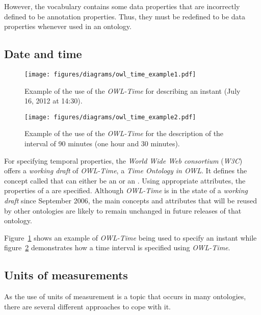 However, the vocabulary contains some data properties that are incorrectly defined to be annotation properties. Thus, they must be redefined to be data properties whenever used in an  ontology.

\subsection{Date and time}
\label{subsec:date_ontologies}

\begin{figure}
\centering
\texttt{[image: figures/diagrams/owl\_time\_example1.pdf]}
\caption{Example of the use of the \emph{OWL-Time} for describing an instant (July 16, 2012 at 14:30).}
\label{fig:owl_time_example1}
\end{figure}

\begin{figure}
\centering
\texttt{[image: figures/diagrams/owl\_time\_example2.pdf]}
\caption{Example of the use of the \emph{OWL-Time} for the description of the interval of 90 minutes (one hour and 30 minutes).}
\label{fig:owl_time_example2}
\end{figure}

For specifying temporal properties, the \emph{World Wide Web consortium} (\emph{W3C}) offers a \emph{working draft} of \emph{OWL-Time}\cite{owl-time}, a \emph{Time Ontology in OWL}. It defines the concept called  that can either be an  or an . Using appropriate attributes, the properties of a  are specified. Although \emph{OWL-Time} is in the state of a \emph{working draft} since September 2006, the main concepts and attributes that will be reused by other ontologies are likely to remain unchanged in future releases of that ontology.

Figure~\ref{fig:owl_time_example1} shows an example of \emph{OWL-Time} being used to specify an instant while figure~\ref{fig:owl_time_example2} demonstrates how a time interval is specified using \emph{OWL-Time}.

\subsection{Units of measurements}
\label{subsec:unit_ontologies}

As the use of units of measurement is a topic that occurs in many ontologies, there are several different approaches to cope with it.

